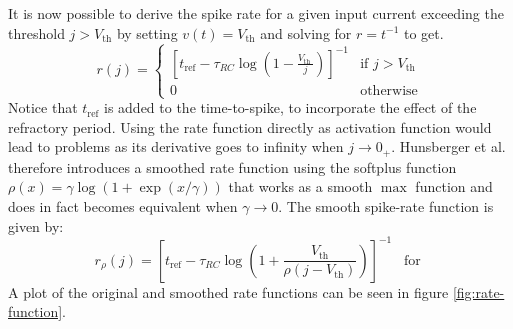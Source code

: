 \documentclass[a4paper,11pt]{article}
\begin{document}
It is now possible to derive the spike rate for a given input current exceeding the threshold $j>V_\text{th}$ by setting $v(t) = V_\text{th}$ and solving for $r = t^{-1}$ to get.
\begin{equation}
  r(j) = \begin{cases} 
      \left[t_\text{ref} - \tau_{RC} \log \left(1-\frac{V_{\text {th }}}{j}\right) \right]^{-1} & \text{if } j > V_\text{th} \\
      0 & \text{otherwise}
  \end{cases}
\end{equation}
Notice that $t_\text{ref}$ is added to the time-to-spike, to incorporate the effect of the refractory period. Using the rate function directly as activation function would lead to problems as its derivative goes to infinity when $j \to 0_{+}$. Hunsberger et al. therefore introduces a smoothed rate function using the softplus function $\rho(x) = \gamma \log(1 + \exp(x / \gamma))$ that works as a smooth $\max$ function and does in fact becomes equivalent when $\gamma \to 0$. The smooth spike-rate function is given by:
\begin{equation} \label{eq:soft-rate}
  r_\rho(j) = \left[t_\text{ref} - \tau_{RC} \log \left(1 + \frac{ V_{\text{th}} }{ \rho(j - V_\text{th})}\right) \right]^{-1} \hspace{10pt} \text{for }
\end{equation}
A plot of the original and smoothed rate functions can be seen in figure \ref{fig:rate-function}.
\end{document}
